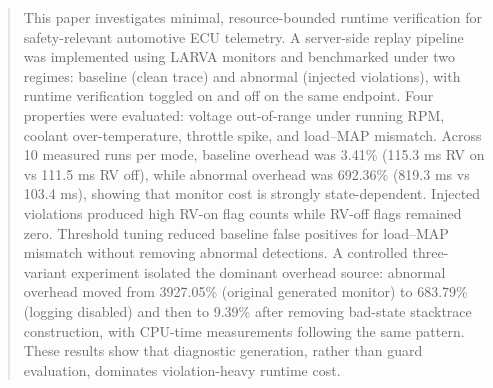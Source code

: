 \begin{abstract}
This paper investigates minimal, resource-bounded runtime verification for safety-relevant automotive ECU telemetry. A server-side replay pipeline was implemented using LARVA monitors and benchmarked under two regimes: baseline (clean trace) and abnormal (injected violations), with runtime verification toggled on and off on the same endpoint. Four properties were evaluated: voltage out-of-range under running RPM, coolant over-temperature, throttle spike, and load--MAP mismatch. Across 10 measured runs per mode, baseline overhead was 3.41\% (115.3 ms RV on vs 111.5 ms RV off), while abnormal overhead was 692.36\% (819.3 ms vs 103.4 ms), showing that monitor cost is strongly state-dependent. Injected violations produced high RV-on flag counts while RV-off flags remained zero. Threshold tuning reduced baseline false positives for load--MAP mismatch without removing abnormal detections. A controlled three-variant experiment isolated the dominant overhead source: abnormal overhead moved from 3927.05\% (original generated monitor) to 683.79\% (logging disabled) and then to 9.39\% after removing bad-state stacktrace construction, with CPU-time measurements following the same pattern. These results show that diagnostic generation, rather than guard evaluation, dominates violation-heavy runtime cost.
\end{abstract}